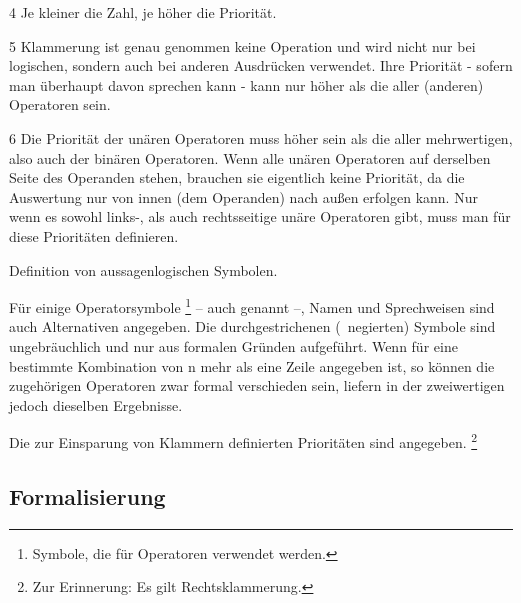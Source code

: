 \begin{table}
\begin{threeparttable}
\begin{tablenotes}
			\item[4] Je kleiner die Zahl, je höher die Priorität.
			\item[5] Klammerung ist genau genommen keine Operation und wird nicht nur bei logischen, sondern auch bei anderen Ausdrücken verwendet. Ihre Priorität - sofern man überhaupt davon sprechen kann - kann nur höher als die aller (anderen) Operatoren sein.
			\item[6] Die Priorität der unären Operatoren muss höher sein als die aller mehrwertigen, also auch der binären Operatoren.
			Wenn alle unären Operatoren auf derselben Seite des Operanden stehen, brauchen sie eigentlich keine Priorität, da die Auswertung nur von innen (dem Operanden) nach außen erfolgen kann.
			Nur wenn es sowohl links-, als auch rechtsseitige unäre Operatoren gibt, muss man für diese Prioritäten definieren.
		\end{tablenotes}
	\end{threeparttable}
	\caption{Definition von aussagenlogischen Symbolen.}
	\label{tab:Symbole}%
\end{table}

Für einige Operatorsymbole%
\footnote{Symbole, die für Operatoren verwendet werden.}
-- auch  genannt --, Namen und Sprechweisen sind auch Alternativen angegeben.
Die durchgestrichenen (\textdh\ negierten) Symbole sind ungebräuchlich und nur aus formalen Gründen aufgeführt.
Wenn für eine bestimmte Kombination von n mehr als eine Zeile angegeben ist, so können die zugehörigen Operatoren zwar formal verschieden sein, liefern in der zweiwertigen  jedoch dieselben Ergebnisse.

Die zur Einsparung von Klammern definierten Prioritäten sind  angegeben.%
\footnote{Zur Erinnerung: Es gilt Rechtsklammerung. }

\subsection{Formalisierung}%
\label{sub:Formalisierung}

